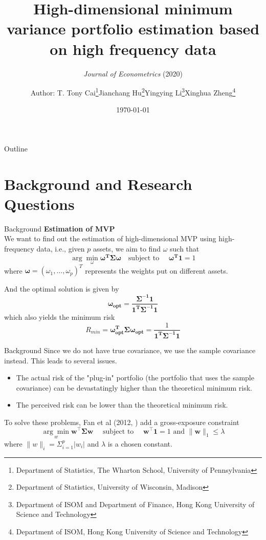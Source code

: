 \documentclass{beamer}
\title[Read Papers]{High-dimensional minimum variance portfolio estimation based on high frequency data}
\subtitle{\textit{Journal of Econometrics} (2020)}
\author[Zhiming]{
    Author: T. Tony Cai\footnote{Department of Statistics, The Wharton School, University of Pennsylvania}\quad Jianchang Hu\footnote{Department of Statistics, University of Wisconsin, Madison}\quad Yingying Li\footnote{Department of ISOM and Department of Finance, Hong Kong University of Science and Technology}\quad Xinghua Zheng\footnote{Department of ISOM, Hong Kong University of Science and Technology}
    \vspace{0.1in}
    }
\date{\today}
\begin{document}
\frame[plain]{\maketitle}

\begin{frame}{Outline}
    \label{outline}
    \tableofcontents{}
\end{frame}

\section{Background and Research Questions}


\begin{frame}{Background}
\textbf{Estimation of MVP}\\
We want to find out the estimation of high-dimensional MVP using high-frequency data, i.e., given $p$ assets, we aim to find $\omega$ such that
\begin{equation}
    \label{eqt:1-1}
    \arg \min_{\omega} \bm{\omega^T \Sigma \omega} \quad\text{subject to }\quad \bm{\omega^T 1}=1
\end{equation}
where $\bm{\omega} = (\omega_1,\dots, \omega_p)^T$ represents the weights put on different assets.

And the optimal solution is given by
\begin{equation}
    \label{eqt:1-2}
    \bm{\omega_{opt}} = \bm{\frac{\Sigma^{-1} 1}{1^T \Sigma^{-1}1}}
\end{equation}
which also yields the minimum risk
\begin{equation}
    \label{eqt:1-3}
    R_{min}= \bm{\omega^T_{opt}\Sigma \omega_{opt}} = \frac{1}{\bm{1^T\Sigma^{-1}1}}
\end{equation}
\end{frame}

\begin{frame}{Background}
Since we do not have true covariance, we use the sample covariance instead. This leads to several issues.
\begin{itemize}
    \item The actual risk of the "plug-in" portfolio (the portfolio that uses the sample covariance) can be devastatingly higher than the theoretical minimum risk.
    \item The perceived risk can be lower than the theoretical minimum risk.
\end{itemize}
To solve these problems, Fan et al (2012, \cite{fan2012vast}) add a gross-exposure constraint
\begin{equation}
    \label{eqt:1-4}
    \underset{w}{\arg \min } \boldsymbol{w}^{\top} \boldsymbol{\Sigma} \boldsymbol{w} \quad \text { subject to } \quad \boldsymbol{w}^{\top} \mathbf{1}=1 \text { and }\|\boldsymbol{w}\|_1 \leq \lambda
\end{equation}
where $\|w\|_i = \Sigma_{i=1}^p|w_i|$ and $\lambda$ is a chosen constant.

\end{frame}
\end{document}
